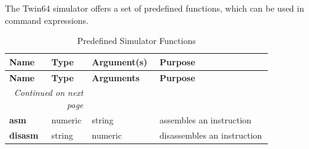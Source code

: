 
The Twin64 simulator offers a set of predefined functions, which can be used in command expressions.


\begin{longtable}{@{}p{0.15\linewidth}p{0.1\linewidth}p{0.2\linewidth}p{0.4\linewidth}@{}}
    \caption{Predefined Simulator Functions} \\
    \toprule
    \textbf{Name} & \textbf{Type } & \textbf{Argument(s) } & \textbf{Purpose} \\
    \midrule
    \endfirsthead
    \toprule
    \textbf{Name} & \textbf{Type } & \textbf{Arguments } & \textbf{Purpose} \\
    \midrule
    \endhead
    \midrule
    \multicolumn{2}{r}{\textit{Continued on next page}} \\
    \midrule
    \endfoot
    \bottomrule
    \endlastfoot
    \textbf{asm} & numeric & string & assembles an instruction \\
    \midrule
    \textbf{disasm} & string & numeric & disassembles an instruction  \\
\end{longtable}




